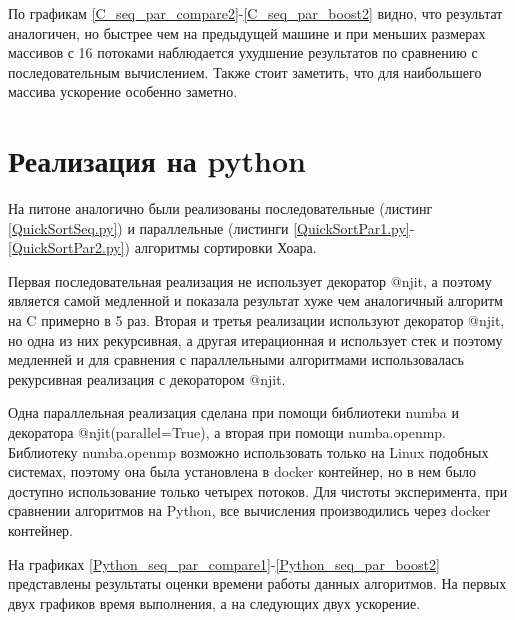 \documentclass[a4paper,oneside,14pt]{extreport}
\begin{document}
По графикам \ref{C_seq_par_compare2}-\ref{C_seq_par_boost2} видно, что результат аналогичен, но быстрее чем на предыдущей машине и при меньших размерах массивов с 16 потоками наблюдается ухудшение результатов по сравнению с последовательным вычислением. Также стоит заметить, что для наибольшего массива ускорение особенно заметно.

\section*{Реализация на python}

На питоне аналогично были реализованы последовательные (листинг \ref{QuickSortSeq.py}) и параллельные (листинги \ref{QuickSortPar1.py}-\ref{QuickSortPar2.py}) алгоритмы сортировки Хоара.

Первая последовательная реализация не использует декоратор @njit, а поэтому является самой медленной и показала результат хуже чем аналогичный алгоритм на C примерно в 5 раз. Вторая и третья реализации используют декоратор @njit, но одна из них рекурсивная, а другая итерационная и использует стек и поэтому медленней и для сравнения с параллельными алгоритмами использовалась рекурсивная реализация с декоратором @njit.

Одна параллельная реализация сделана при помощи библиотеки numba и декоратора @njit(parallel=True), а вторая при помощи numba.openmp. Библиотеку numba.openmp возможно использовать только на Linux подобных системах, поэтому она была установлена в docker контейнер, но в нем было доступно использование только четырех потоков. Для чистоты эксперимента, при сравнении алгоритмов на Python, все вычисления производились через docker контейнер.

На графиках \ref{Python_seq_par_compare1}-\ref{Python_seq_par_boost2} представлены результаты оценки времени работы данных алгоритмов. На первых двух графиков время выполнения, а на следующих двух ускорение.
\end{document}
